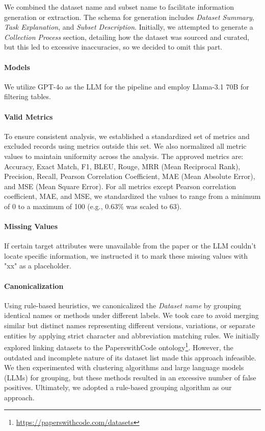 We combined the dataset name and subset name to facilitate information generation or extraction. 
The schema for generation includes \textit{Dataset Summary}, \textit{Task Explanation}, and \textit{Subset Description}. 
Initially, we attempted to generate a \textit{Collection Process} section, detailing how the dataset was sourced and curated, but this led to excessive inaccuracies, so we decided to omit this part.

\paragraph{Models} We utilize GPT-4o \citep{hurst2024gpt} as the LLM for the pipeline and employ Llama-3.1 70B \citep{dubey2024llama} for filtering tables.

\paragraph{Valid Metrics} 

To ensure consistent analysis, we established a standardized set of metrics and excluded records using metrics outside this set. 
We also normalized all metric values to maintain uniformity across the analysis.
The approved metrics are: Accuracy, Exact Match, F1, BLEU, Rouge, MRR (Mean Reciprocal Rank), Precision, Recall, Pearson Correlation Coefficient, MAE (Mean Absolute Error), and MSE (Mean Square Error). 
For all metrics except Pearson correlation coefficient, MAE, and MSE, we standardized the values to range from a minimum of 0 to a maximum of 100 (e.g., 0.63\% was scaled to 63).

\paragraph{Missing Values} If certain target attributes were unavailable from the paper or the LLM couldn't locate specific information, we instructed it to mark these missing values with "xx" as a placeholder.

\paragraph{Canonicalization} 

Using rule-based heuristics, we canonicalized the \textit{Dataset name} by grouping identical names or methods under different labels. 
We took care to avoid merging similar but distinct names representing different versions, variations, or separate entities by applying strict character and abbreviation matching rules.
We initially explored linking datasets to the PaperswithCode ontology\footnote{\url{https://paperswithcode.com/datasets}}. 
However, the outdated and incomplete nature of its dataset list made this approach infeasible. 
We then experimented with clustering algorithms and large language models (LLMs) for grouping, but these methods resulted in an excessive number of false positives. 
Ultimately, we adopted a rule-based grouping algorithm as our approach.

